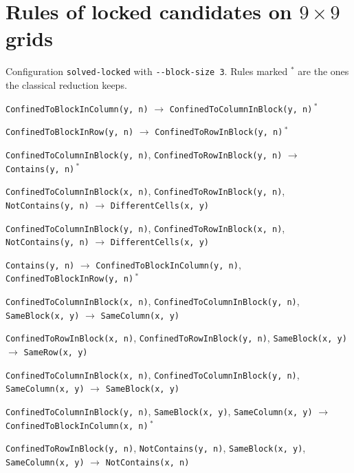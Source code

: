 \documentclass[11pt,a4paper]{article}
\theoremstyle{definition}
\theoremstyle{remark}
\newcommand{\code}[1]{\texttt{#1}}
\begin{document}
\section{Rules of locked candidates on \texorpdfstring{$9 \times 9$}{9x9} grids}\label{app:locked}

Configuration \code{solved-locked} with \code{-{}-block-size 3}. Rules marked $^{\ast}$ are the ones the classical reduction keeps.

{\small\raggedright
\begin{enumerate}[label={[\arabic*]},leftmargin=2.6em,itemsep=1pt]
  \item \texttt{ConfinedToBlockInColumn(y,~n)} \;$\to$\; \texttt{ConfinedToColumnInBlock(y,~n)}\,$^{\ast}$
  \item \texttt{ConfinedToBlockInRow(y,~n)} \;$\to$\; \texttt{ConfinedToRowInBlock(y,~n)}\,$^{\ast}$
  \item \texttt{ConfinedToColumnInBlock(y,~n)}, \allowbreak \texttt{ConfinedToRowInBlock(y,~n)} \;$\to$\; \texttt{Contains(y,~n)}\,$^{\ast}$
  \item \texttt{ConfinedToColumnInBlock(x,~n)}, \allowbreak \texttt{ConfinedToRowInBlock(y,~n)}, \allowbreak \texttt{NotContains(y,~n)} \;$\to$\; \texttt{DifferentCells(x,~y)}
  \item \texttt{ConfinedToColumnInBlock(y,~n)}, \allowbreak \texttt{ConfinedToRowInBlock(x,~n)}, \allowbreak \texttt{NotContains(y,~n)} \;$\to$\; \texttt{DifferentCells(x,~y)}
  \item \texttt{Contains(y,~n)} \;$\to$\; \texttt{ConfinedToBlockInColumn(y,~n)}, \allowbreak \texttt{ConfinedToBlockInRow(y,~n)}\,$^{\ast}$
  \item \texttt{ConfinedToColumnInBlock(x,~n)}, \allowbreak \texttt{ConfinedToColumnInBlock(y,~n)}, \allowbreak \texttt{SameBlock(x,~y)} \;$\to$\; \texttt{SameColumn(x,~y)}
  \item \texttt{ConfinedToRowInBlock(x,~n)}, \allowbreak \texttt{ConfinedToRowInBlock(y,~n)}, \allowbreak \texttt{SameBlock(x,~y)} \;$\to$\; \texttt{SameRow(x,~y)}
  \item \texttt{ConfinedToColumnInBlock(x,~n)}, \allowbreak \texttt{ConfinedToColumnInBlock(y,~n)}, \allowbreak \texttt{SameColumn(x,~y)} \;$\to$\; \texttt{SameBlock(x,~y)}
  \item \texttt{ConfinedToColumnInBlock(y,~n)}, \allowbreak \texttt{SameBlock(x,~y)}, \allowbreak \texttt{SameColumn(x,~y)} \;$\to$\; \texttt{ConfinedToBlockInColumn(x,~n)}\,$^{\ast}$
  \item \texttt{ConfinedToRowInBlock(y,~n)}, \allowbreak \texttt{NotContains(y,~n)}, \allowbreak \texttt{SameBlock(x,~y)}, \allowbreak \texttt{SameColumn(x,~y)} \;$\to$\; \texttt{NotContains(x,~n)}

\end{enumerate}}
\end{document}

